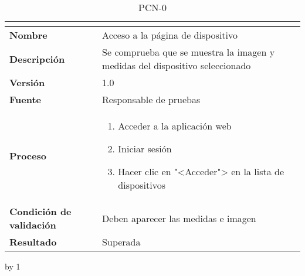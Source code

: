 \begin{table}[H]
	\caption{PCN-0\number\pcn}
	\begin{tabular}{|l|p{}|}
		\hline
		\multicolumn{2}{|c|}{\cellcolor[HTML]{BFBFBF}{\color[HTML]{000000} \textbf{PCN-0\number\pcn}}} \\ \hline
		\textbf{Nombre}                  & Acceso a la página de dispositivo                                            \\ \hline
		\textbf{Descripción}             & Se comprueba que se muestra la imagen y medidas del dispositivo seleccionado \\ \hline
		\textbf{Versión}                 & 1.0                                                                          \\ \hline
		\textbf{Fuente}                  & Responsable de pruebas                                                       \\ \hline
		\textbf{Proceso}                 & \begin{enumerate}
			\item Acceder a la aplicación web
			\item Iniciar sesión
			\item Hacer clic en "<Acceder"> en la lista de dispositivos
		\end{enumerate}                                                   \\ \hline
		\textbf{Condición de validación} & Deben aparecer las medidas e imagen                                          \\ \hline
		\textbf{Resultado}               & Superada                                                                     \\ \hline
	\end{tabular}
\end{table}
\advance\pcn by 1
